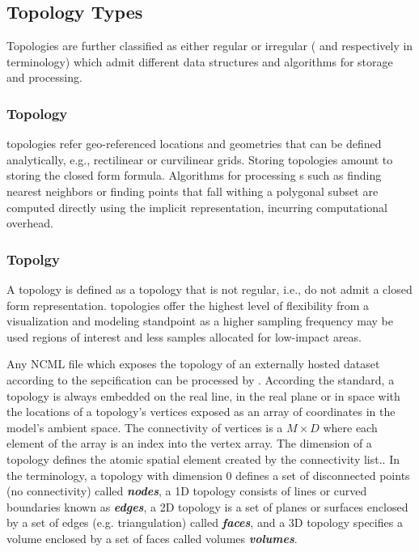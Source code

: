 \subsection{Topology Types}
Topologies are further classified as either regular or irregular ({\bf
  \cgrid{}} and {\bf \ugrid} respectively in \sciwms{} terminology)
which admit different data structures and algorithms for storage and
processing.

\subsubsection{\cgrid{} Topology}
\cgrid{} topologies refer geo-referenced locations and
geometries that can be defined analytically, e.g., rectilinear or
curvilinear grids. Storing \cgrid{} topologies amount to storing the
closed form formula. Algorithms for processing \cgrid{}s such as
finding nearest neighbors or finding points that fall withing a
polygonal subset are computed directly using the implicit \cgrid{}
representation, incurring computational overhead.

\subsubsection{\ugrid{} Topolgy}
A \ugrid{} topology is  defined as a topology that is not regular, i.e.,
do not admit a closed form representation. \ugrid{} topologies offer
the highest level of flexibility from a visualization and modeling
standpoint as a higher sampling frequency may be used regions of
interest and less samples allocated for low-impact areas. 

Any NCML file which exposes the topology of an externally hosted
dataset according to the \cfugrid{} sepcification can be processed by
\sciwms{}. According the \cfugrid{} standard, a topology is always
embedded on the real line, in the real plane or in space with the
locations of a \ugrid{} topology's vertices exposed as an array of
coordinates in the model's ambient space. The connectivity of vertices
is a $M \times D$ where each element of the array is an index into the
vertex array. The dimension of a topology defines the atomic spatial
element created by the connectivity list.. In the \cfugrid{}
terminology, a topology with dimension 0 defines a set of disconnected
points (no connectivity) called \textbf{\textit{nodes}}, a 1D topology
consists of lines or curved boundaries known as
\textbf{\textit{edges}}, a 2D topology is a set of planes or surfaces
enclosed by a set of edges (e.g. triangulation) called
\textbf{\textit{faces}}, and a 3D topology specifies a volume enclosed
by a set of faces called volumes \textbf{\textit{volumes}}.

